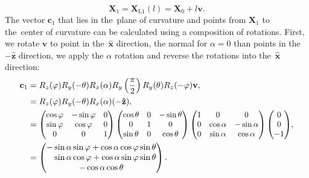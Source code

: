 				\begin{equation}
					\mathbf{X}_1 = \mathbf{X}_\text{L1}(l) = \mathbf{X}_0 + l\mathbf{v}.
				\end{equation}
			The vector $\mathbf{c}_1$ that lies in the~plane of curvature and points from $\mathbf{X}_1$ to the~center of curvature can be calculated using a composition of rotations. First, we rotate $\mathbf{v}$ to point in the~$\mathbf{\hat{x}}$ direction, the normal for $\alpha = 0$ than points in the $-\mathbf{\hat{z}}$ direction, we apply the $\alpha$ rotation and reverse the rotations into the~$\mathbf{\hat{x}}$ direction:
				\begin{equation}
					\begin{aligned}
						\mathbf{c}_1 &= R_z(\varphi)R_y(-\theta)R_x(\alpha)R_y\left(\frac{\pi}{2}\right)R_y(\theta)R_z(-\varphi)\mathbf{v},\\
						&= R_z(\varphi)R_y(-\theta)R_x(\alpha)(-\mathbf{\hat{z}}),\\
						&= \scalebox{0.95}{$
								\begin{pmatrix}
									\cos\varphi & -\sin\varphi & 0\\
									\sin\varphi & \cos\varphi & 0\\
									0 & 0 & 1
								\end{pmatrix}
								\begin{pmatrix}
									\cos\theta & 0 & -\sin\theta\\
									0 & 1 & 0\\
									\sin\theta & 0 & \cos\theta
								\end{pmatrix}
								\begin{pmatrix}
									1 & 0 & 0\\
									0 & \cos\alpha & -\sin\alpha\\
									0 & \sin\alpha & \cos\alpha
								\end{pmatrix}
								\begin{pmatrix}
									0\\ 0\\ -1
								\end{pmatrix}
							$},\\
						&= 	\begin{pmatrix}
								-\sin\alpha\sin\varphi+\cos\alpha\cos\varphi\sin\theta\\
								\phantom{-}\sin\alpha\cos\varphi+\cos\alpha\sin\varphi\sin\theta\\
								-\cos\alpha\cos\theta
							\end{pmatrix}.
					\end{aligned}
				\end{equation}
